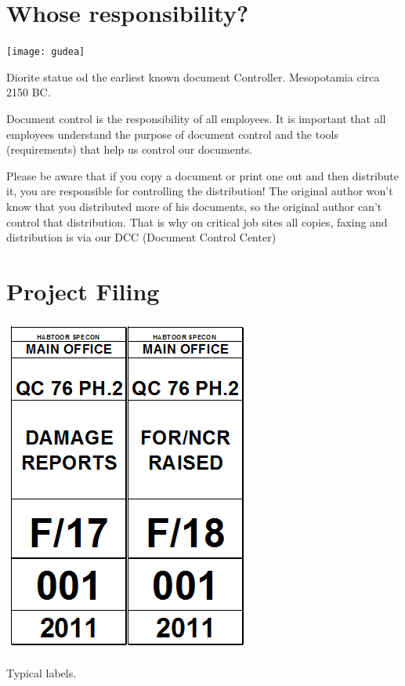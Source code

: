 \section*{Whose responsibility?}

\begin{marginfigure}
  \texttt{[image: gudea]}
  \caption{Diorite statue od the earliest known document Controller. Mesopotamia circa 2150 BC.}
  \label{fig:marginfig1}
\end{marginfigure}

Document control is the responsibility of all employees. It is important that all employees understand the purpose of document control and the tools (requirements) that help us control our documents.

Please be aware that if you copy a document or print one out and then distribute it, you are responsible for controlling the distribution! The original author won't know that you distributed more of his documents, so the original author can't control that distribution. That is why on critical job sites all copies, faxing and distribution is via our DCC (Document Control Center)






\section*{Project Filing}


\begin{marginfigure}
  \includegraphics[width=\linewidth]{labels}
  \caption{Typical labels.}
  \label{fig:marginfig1}
\end{marginfigure}

